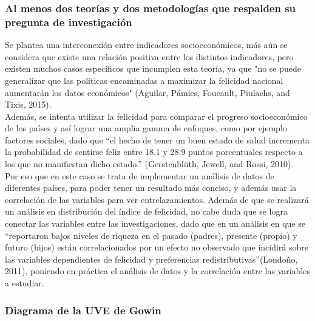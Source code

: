 \documentclass[12pt,oneside,letterpaper,spanish]{article}
\begin{document}
\subsubsection{Al menos dos teorías y dos metodologías que respalden su pregunta de investigación}
Se plantea una interconexión entre indicadores socioeconómicos, más aún se considera que existe una relación positiva entre los distintos indicadores, pero existen muchos casos específicos que incumplen esta teoría, ya que "no se puede generalizar que las políticas encaminadas a maximizar la felicidad nacional aumentarán los datos económicos" (Aguilar, Pámies, Foucault, Piulachs, and Tixis, 2015). \\
Además, se intenta utilizar la felicidad para comparar el progreso socioeconómico de los países y así lograr una amplia gamma de enfoques, como por ejemplo factores sociales, dado que ``el hecho de tener un buen estado de salud incrementa la probabilidad de sentirse feliz entre 18.1 y 28.9 puntos porcentuales respecto a los que no manifiestan dicho estado.'' (Gerstenblüth, Jewell, and Rossi, 2010). \\
Por eso que en este caso se trata de implementar un análisis de datos de diferentes países, para poder tener un resultado más conciso, y además usar la correlación de las variables para ver entrelazamientos. Además de que se realizará un análisis en distribución del índice de felicidad, no cabe duda que se logra conectar las variables entre las investigaciones, dado que en un análisis en que se ``reportaron bajos niveles de riqueza en el pasado (padres), presente (propio) y futuro (hijos) están correlacionados por un efecto no observado que incidirá sobre las variables dependientes de felicidad y preferencias redistributivas''(Londoño, 2011), poniendo en práctica el análisis de datos y la correlación entre las variables a estudiar. 


\subsubsection{Diagrama de la UVE de Gowin}
\end{document}

